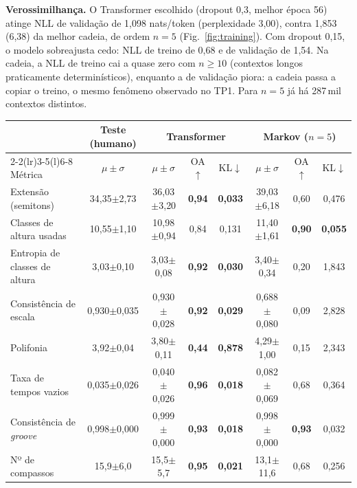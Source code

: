 \documentclass{article}
\begin{document}
\textbf{Verossimilhança.} O Transformer escolhido (dropout 0{,}3, melhor época 56) atinge NLL de validação de 1{,}098 nats/token (perplexidade 3{,}00), contra 1{,}853 (6{,}38) da melhor cadeia, de ordem $n=5$ (Fig.~\ref{fig:training}). Com dropout 0{,}15, o modelo sobreajusta cedo: NLL de treino de 0{,}68 e de validação de 1{,}54. Na cadeia, a NLL de treino cai a quase zero com $n\ge10$ (contextos longos praticamente determinísticos), enquanto a de validação piora: a cadeia passa a copiar o treino, o mesmo fenômeno observado no TP1. Para $n=5$ já há 287\,mil contextos distintos.

\begin{table}[t]
\centering\small
\setlength{\tabcolsep}{4pt}
\begin{tabular}{@{}lccccccc@{}}
\toprule
 & Teste (humano) & \multicolumn{3}{c}{Transformer} & \multicolumn{3}{c}{Markov ($n=5$)} \\
\cmidrule(lr){2-2}\cmidrule(lr){3-5}\cmidrule(l){6-8}
Métrica & $\mu\pm\sigma$ & $\mu\pm\sigma$ & OA$\uparrow$ & KL$\downarrow$ & $\mu\pm\sigma$ & OA$\uparrow$ & KL$\downarrow$ \\
\midrule
Extensão (semitons)           & 34{,}35$\pm$2{,}73 & 36{,}03$\pm$3{,}20 & \textbf{0{,}94} & \textbf{0{,}033} & 39{,}03$\pm$6{,}18 & 0{,}60 & 0{,}476 \\
Classes de altura usadas      & 10{,}55$\pm$1{,}10 & 10{,}98$\pm$0{,}94 & 0{,}84 & 0{,}131 & 11{,}40$\pm$1{,}61 & \textbf{0{,}90} & \textbf{0{,}055} \\
Entropia de classes de altura & 3{,}03$\pm$0{,}10 & 3{,}03$\pm$0{,}08 & \textbf{0{,}92} & \textbf{0{,}030} & 3{,}40$\pm$0{,}34 & 0{,}20 & 1{,}843 \\
Consistência de escala        & 0{,}930$\pm$0{,}035 & 0{,}930$\pm$0{,}028 & \textbf{0{,}92} & \textbf{0{,}029} & 0{,}688$\pm$0{,}080 & 0{,}09 & 2{,}828 \\
Polifonia                     & 3{,}92$\pm$0{,}04 & 3{,}80$\pm$0{,}11 & \textbf{0{,}44} & \textbf{0{,}878} & 4{,}29$\pm$1{,}00 & 0{,}15 & 2{,}343 \\
Taxa de tempos vazios         & 0{,}035$\pm$0{,}026 & 0{,}040$\pm$0{,}026 & \textbf{0{,}96} & \textbf{0{,}018} & 0{,}082$\pm$0{,}069 & 0{,}68 & 0{,}364 \\
Consistência de \textit{groove} & 0{,}998$\pm$0{,}000 & 0{,}999$\pm$0{,}000 & \textbf{0{,}93} & \textbf{0{,}018} & 0{,}998$\pm$0{,}000 & \textbf{0{,}93} & 0{,}032 \\
Nº de compassos               & 15{,}9$\pm$6{,}0 & 15{,}5$\pm$5{,}7 & \textbf{0{,}95} & \textbf{0{,}021} & 13{,}1$\pm$11{,}6 & 0{,}68 & 0{,}256 \\

\end{tabular}
\end{table}
\end{document}
